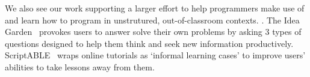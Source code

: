 We also see our work supporting a larger effort to help programmers make use of and learn how to program in unstrutured, out-of-classroom contexts.
.
The Idea Garden~\cite{cao_barriers_2012}\cite{cao_end-user_2013} provokes users to answer solve their own problems by asking 3 types of questions designed to help them think and seek new information productively.
ScriptABLE~\cite{dorn_scriptable_2011} wraps online tutorials as `informal learning cases' to improve users' abilities to take lessons away from them. 
